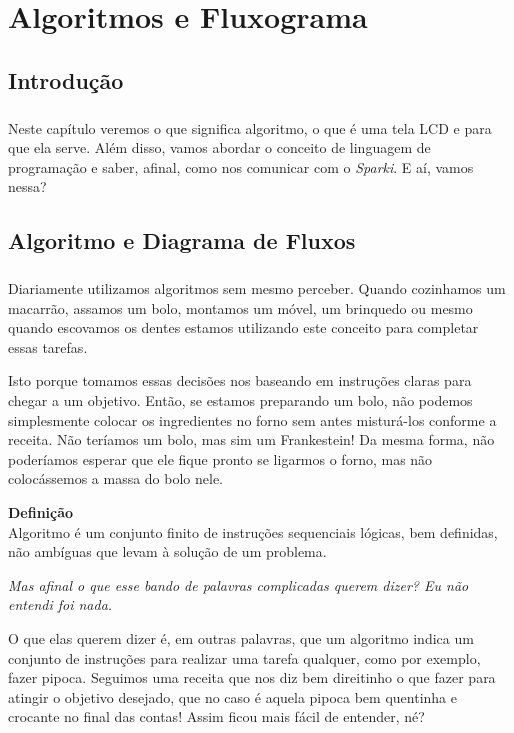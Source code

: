 \chapter{Algoritmos e Fluxograma}
\section*{Introdução}
    \paragraph{}
    Neste capítulo veremos o que significa algoritmo, o que é uma tela LCD e para que ela serve. Além disso, vamos abordar o conceito de linguagem de programação e saber, afinal, como nos comunicar com o \textit{Sparki}. E aí, vamos nessa?
\section{Algoritmo e Diagrama de Fluxos}
    \paragraph{}
    Diariamente utilizamos algoritmos sem mesmo perceber. Quando cozinhamos um macarrão, assamos um bolo, montamos um móvel, um brinquedo ou mesmo quando escovamos os dentes estamos utilizando este conceito para completar essas tarefas. \par
    Isto porque tomamos essas decisões nos baseando em instruções claras para chegar a um objetivo. Então, se estamos preparando um bolo, não podemos simplesmente colocar os ingredientes no forno sem antes misturá-los conforme a receita. Não teríamos um bolo, mas sim um Frankestein! Da mesma forma, não poderíamos esperar que ele fique pronto se ligarmos o forno, mas não colocássemos a massa do bolo nele. \par
    \begin{center}
    \textbf{Definição} \\
    Algoritmo é um conjunto finito de instruções sequenciais lógicas, bem definidas, não ambíguas que levam à solução de um problema.
    \end{center}
    
    \textit{Mas afinal o que esse bando de palavras complicadas querem dizer? Eu não entendi foi nada.}\par
    O que elas querem dizer é, em outras palavras, que um algoritmo indica um conjunto de instruções para realizar uma tarefa qualquer, como por exemplo, fazer pipoca. Seguimos uma receita que nos diz bem direitinho o que fazer para atingir o objetivo desejado, que no caso é aquela pipoca bem quentinha e crocante no final das contas! Assim ficou mais fácil de entender, né? \par

